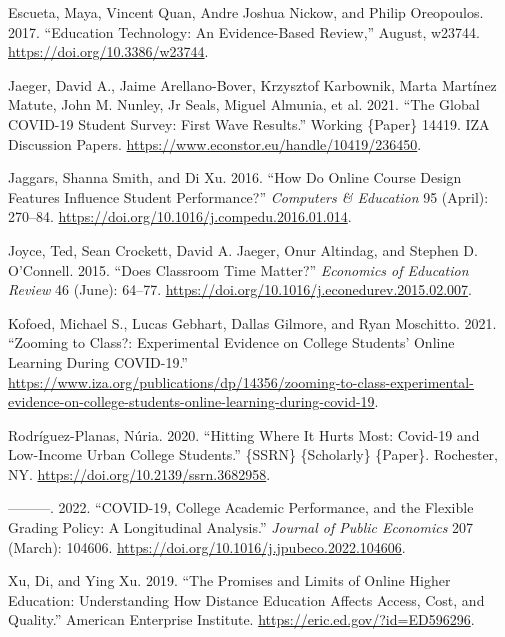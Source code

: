 \documentclass[
  12pt,
  letterpaper,
  DIV=11,
  numbers=noendperiod]{scrartcl}
\newlength{\cslhangindent}
\newenvironment{CSLReferences}[2] %
 {\begin{list}{}{%
  \setlength{\itemindent}{0pt}
  \setlength{\leftmargin}{0pt}
  \setlength{\parsep}{0pt}
  \ifodd #1
   \setlength{\leftmargin}{\cslhangindent}
   \setlength{\itemindent}{-1\cslhangindent}
  \fi
  \setlength{\itemsep}{#2\baselineskip}}}
 {\end{list}}
\begin{document}
\begin{CSLReferences}{1}{0}
Escueta, Maya, Vincent Quan, Andre Joshua Nickow, and Philip Oreopoulos.
2017. {``Education {Technology}: {An} {Evidence}-{Based} {Review},''}
August, w23744. \url{https://doi.org/10.3386/w23744}.

Jaeger, David A., Jaime Arellano-Bover, Krzysztof Karbownik, Marta
Martínez Matute, John M. Nunley, Jr Seals, Miguel Almunia, et al. 2021.
{``The {Global} {COVID}-19 {Student} {Survey}: {First} {Wave}
{Results}.''} Working \{Paper\} 14419. IZA Discussion Papers.
\url{https://www.econstor.eu/handle/10419/236450}.

Jaggars, Shanna Smith, and Di Xu. 2016. {``How Do Online Course Design
Features Influence Student Performance?''} \emph{Computers \& Education}
95 (April): 270--84.
\url{https://doi.org/10.1016/j.compedu.2016.01.014}.

Joyce, Ted, Sean Crockett, David A. Jaeger, Onur Altindag, and Stephen
D. O'Connell. 2015. {``Does Classroom Time Matter?''} \emph{Economics of
Education Review} 46 (June): 64--77.
\url{https://doi.org/10.1016/j.econedurev.2015.02.007}.

Kofoed, Michael S., Lucas Gebhart, Dallas Gilmore, and Ryan Moschitto.
2021. {``Zooming to {Class}?: {Experimental} {Evidence} on {College}
{Students}' {Online} {Learning} During {COVID}-19.''}
\url{https://www.iza.org/publications/dp/14356/zooming-to-class-experimental-evidence-on-college-students-online-learning-during-covid-19}.

Rodríguez-Planas, Núria. 2020. {``Hitting {Where} It {Hurts} {Most}:
{Covid}-19 and {Low}-{Income} {Urban} {College} {Students}.''} \{SSRN\}
\{Scholarly\} \{Paper\}. Rochester, NY.
\url{https://doi.org/10.2139/ssrn.3682958}.

---------. 2022. {``{COVID}-19, College Academic Performance, and the
Flexible Grading Policy: {A} Longitudinal Analysis.''} \emph{Journal of
Public Economics} 207 (March): 104606.
\url{https://doi.org/10.1016/j.jpubeco.2022.104606}.

Xu, Di, and Ying Xu. 2019. {``The {Promises} and {Limits} of {Online}
{Higher} {Education}: {Understanding} {How} {Distance} {Education}
{Affects} {Access}, {Cost}, and {Quality}.''} American Enterprise
Institute. \url{https://eric.ed.gov/?id=ED596296}.

\end{CSLReferences}
\end{document}
